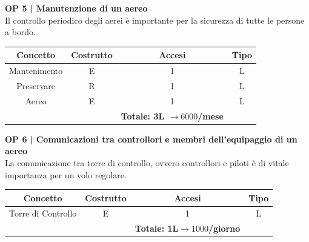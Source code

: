 \vspace{.6cm}


\textbf{\small OP 5 | Manutenzione di un aereo}\\

\textsf{\small Il controllo periodico degli aerei è importante per la sicurezza di tutte le persone a bordo.}\break

\begin{tabular}{ c c c c} 
	\hline
	\rowcolor{airforceblue}
	\textbf{\color{white}Concetto} & \textbf{\color{white}Costrutto} & \textbf{\color{white}Accesi} & \textbf{\color{white}Tipo}\\
	\hline
	\textsf{\small Mantenimento} & \textsf{\small E} & \textsf{\small 1} &  \textsf{\small L}\\
	\hline
	\textsf{\small Preservare} & \textsf{\small R} & \textsf{\small 1} &  \textsf{\small L}\\
	\hline
	\textsf{\small Aereo} & \textsf{\small E} & \textsf{\small 1} &  \textsf{\small L}\\
	\hline
	\rowcolor{airforceblue}
	\textsf{\small } & \textsf{\small } & \textbf{\color{white}Totale: 3L $\rightarrow 6000$/mese} \textsf{\small } & \textsf{\small }\\ %
	\hline
\end{tabular}

\vspace{.6cm}


\pagebreak

\textbf{\small OP 6 | Comunicazioni tra controllori e membri dell'equipaggio di un aereo}\\

\textsf{\small La comunicazione tra torre di controllo, ovvero controllori e piloti è di vitale importanza per un volo regolare.}\break

\begin{tabular}{ c c c c}
	\hline
	\rowcolor{airforceblue}
	\textbf{\color{white}Concetto} & \textbf{\color{white}Costrutto} & \textbf{\color{white}Accesi} & \textbf{\color{white}Tipo}\\
	\hline
	\textsf{\small Torre di Controllo} & \textsf{\small E} & \textsf{\small 1} &  \textsf{\small L}\\
	\hline
	\rowcolor{airforceblue}
	\textsf{\small } & \textsf{\small } & \textbf{\color{white}Totale: 1L$\rightarrow 1000$/giorno } \textsf{\small } & \textsf{\small }\\ 
	\hline
\end{tabular}


